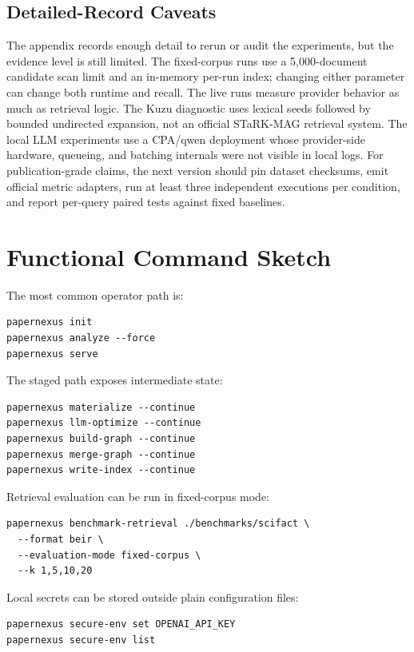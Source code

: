 \documentclass[11pt]{article}
\begin{document}
\subsection{Detailed-Record Caveats}

The appendix records enough detail to rerun or audit the experiments, but the evidence level is still limited. The fixed-corpus runs use a 5,000-document candidate scan limit and an in-memory per-run index; changing either parameter can change both runtime and recall. The live runs measure provider behavior as much as retrieval logic. The Kuzu diagnostic uses lexical seeds followed by bounded undirected expansion, not an official STaRK-MAG retrieval system. The local LLM experiments use a CPA/qwen deployment whose provider-side hardware, queueing, and batching internals were not visible in local logs. For publication-grade claims, the next version should pin dataset checksums, emit official metric adapters, run at least three independent executions per condition, and report per-query paired tests against fixed baselines.

\section{Functional Command Sketch}

The most common operator path is:

\begin{lstlisting}[style=pncode]
papernexus init
papernexus analyze --force
papernexus serve
\end{lstlisting}

The staged path exposes intermediate state:

\begin{lstlisting}[style=pncode]
papernexus materialize --continue
papernexus llm-optimize --continue
papernexus build-graph --continue
papernexus merge-graph --continue
papernexus write-index --continue
\end{lstlisting}

Retrieval evaluation can be run in fixed-corpus mode:

\begin{lstlisting}[style=pncode]
papernexus benchmark-retrieval ./benchmarks/scifact \
  --format beir \
  --evaluation-mode fixed-corpus \
  --k 1,5,10,20
\end{lstlisting}

Local secrets can be stored outside plain configuration files:

\begin{lstlisting}[style=pncode]
papernexus secure-env set OPENAI_API_KEY
papernexus secure-env list
\end{lstlisting}
\end{document}
